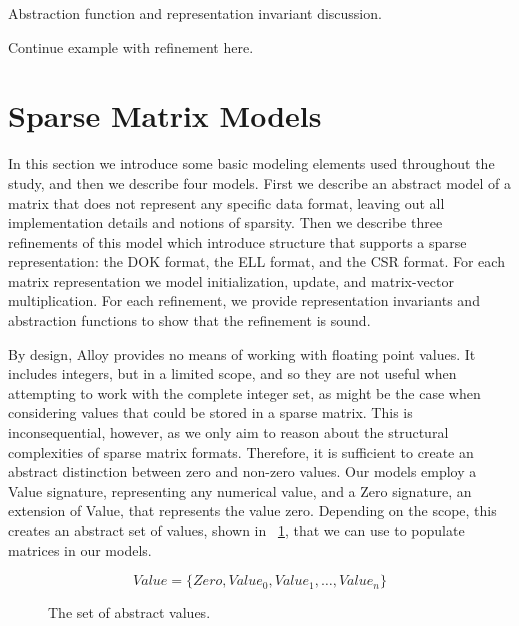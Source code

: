 \documentclass[11pt,conference]{IEEEtran}
\begin{document}
Abstraction function and representation invariant discussion.

Continue example with refinement here.

\section{Sparse Matrix Models}

In this section we introduce some basic modeling elements used throughout the study, and then we describe four models.  First we describe an abstract model of a matrix that does not represent any specific data format, leaving out all implementation details and notions of sparsity. Then we describe three refinements of this model which introduce structure that supports a sparse representation: the DOK format, the ELL format, and the CSR format.  For each matrix representation we model initialization, update, and matrix-vector multiplication.  For each refinement, we provide representation invariants and abstraction functions to show that the refinement is sound.

By design, Alloy provides no means of working with floating point values.  It includes integers, but in a limited scope, and so they are not useful when attempting to work with the complete integer set, as might be the case when considering values that could be stored in a sparse matrix.  This is inconsequential, however, as we only aim to reason about the structural complexities of sparse matrix formats.  Therefore, it is sufficient to create an abstract distinction between zero and non-zero values.  Our models employ a Value signature, representing any numerical value, and a Zero signature, an extension of Value, that represents the value zero.  Depending on the scope, this creates an abstract set of values, shown in \figurename~\ref{fig:values}, that we can use to populate matrices in our models.

\begin{figure}
\begin{displaymath}
Value = \{Zero, Value_0, Value_1, \ldots, Value_n\}
\end{displaymath}
\caption{The set of abstract values.}
\label{fig:values}
\end{figure}
\end{document}
